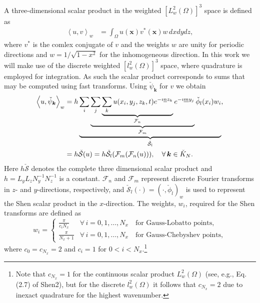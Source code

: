 \documentclass[11pt, oneside]{article}
\newcommand{\N}[1]{\check{#1}}
\begin{document}
A three-dimensional scalar product in the weighted $[L^2_w(\Omega)]^3$ space is defined as
\begin{align}
 \left<u, v\right>_w &= \int_{\Omega} {u(\bm{x}) v^*(\bm{x})}w\,dxdydz, 
\end{align}
where $v^*$ is the comlex conjugate of $v$ and the weights $w$ are unity for 
periodic directions and  $w=1/\sqrt{1-x^2}$ for the inhomogeneous direction. In 
this work we will make use of the discrete weighted $[l^2_w(\Omega)]^3$ space, 
where quadrature is employed for integration. As such the scalar product 
corresponds to sums that may be computed using fast transforms. Using 
$\N{\psi}_{\bm{k}}$ for $v$ we obtain
\begin{align}
 \left< u, \N{\psi}_{\bm{k}} \right>_w &= h \underbrace{\sum_i 
 \underbrace{\sum_j \underbrace{\sum_k u(x_i, y_j, z_k, t)  e^{-\imath 
 \underline{n} z_k}}_{\mathcal{F}_n}  e^{-\imath \underline{m} y_j} 
 }_{\mathcal{F}_m} \N{\phi}_{l}(x_i) w_i}_{\N{\mathcal{S}}_l},   \notag \\
  &=  h \N{\mathcal{S}}(u) = h \N{\mathcal{S}}_{l} (\mathcal{F}_{{m}} 
  (\mathcal{F}_{{n}}(u))), \quad \forall \, \bm{k} \in \N{K}_N. \label{eq:sst1}
\end{align}
Here $h\N{\mathcal{S}}$ denotes the complete three dimensional scalar product 
and $h = L_yL_zN_y^{-1}N_z^{-1}$ is a constant. $\mathcal{F}_{{n}}$ and 
$\mathcal{F}_{{m}}$ represent discrete Fourier transforms in $z$- and 
$y$-directions, respectively, and $\N{\mathcal{S}}_{l}(\cdot) = (\cdot, 
\N{\phi}_l)_w$ is used to represent the Shen scalar product in the 
$x$-direction. The weights, $w_i$, required for the Shen transforms are 
defined as
\begin{equation}
 w_i = \begin{cases}
       \frac{\pi}{c_i N_x} &\forall \, i=0,1,\ldots, N_x \quad  \text{for 
       Gauss-Lobatto points},\\
       \frac{\pi}{N_x+1} &\forall \, i=0,1,\ldots, N_x  \quad \text{for 
       Gauss-Chebyshev points},      
 \end{cases}
\end{equation}
where $c_0 = c_{N_x} = 2$ and $c_i = 1$ for $0 < i < N_x$.\footnote{Note that 
$c_{N_x}=1$ for the continuous scalar product $L^2_w(\Omega)$ (see, e.g., Eq. 
(2.7) of Shen2), but for the discrete $l^2_w(\Omega)$ it follows that 
$c_{N_x}=2$ due to inexact quadrature for the highest wavenumber.}
\end{document}
